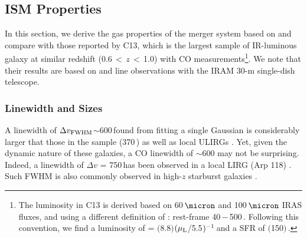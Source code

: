 \documentclass[]{emulateapj}
\begin{document}
\subsection{ISM Properties} \label{sec:properties}
In this section, we derive the gas properties of the merger system
based on \bco and compare with those reported by
C13, which is the largest sample of
IR-luminous galaxy at similar redshift
(0.6\,$<$\,$z$\,$<$\,1.0) with CO measurements\footnote{The
\fir luminosity in C13 is derived based on 60\,$\micron$ and 100\,$\micron$ IRAS fluxes,
and using a different definition of
\LFIR: rest-frame 40\,$-$\,500\,\micron. Following this convention,
we find a \fir luminosity of
\LFIR = $($8.8$)$$(\mu_{\rm L}$/5.5$)\mbox{$^{-1}$}$\,\Lsun and
a SFR of $($150$)$\,\sfrU.}.
We note that their results are based on \bco and  line observations with the
IRAM 30-m single-dish telescope.

\subsubsection{Linewidth and Sizes} \label{sec:sizes}
A linewidth of $\Delta v_{\rm FWHM}$$\sim$600\,\kms found from
fitting a single Gaussian
is considerably larger that those in the  sample
(370\,\kms) as well as local ULIRGs
\citep[300\,\kms, with the largest being 480\,\kms;][hereafter S97]{Solomon97a}.
Yet, given the dynamic nature of these galaxies,
a CO linewidth of $\sim$600 may not be surprising.
Indeed, a linewidth of $\Delta v$ = 750\,\kms has been observed
in a local LIRG (Arp 118) \citep{SV05a}.
Such FWHM is also commonly observed in high-$z$ starburst galaxies
\citep[780\,\kms; \eg][]{Greve05a}.
\end{document}
